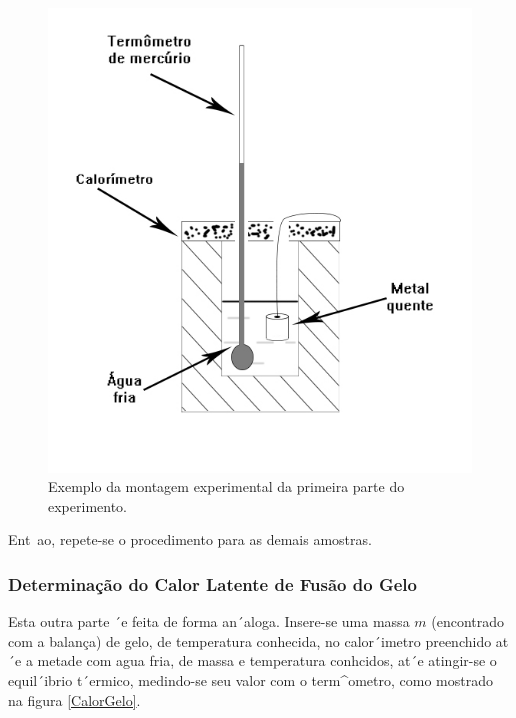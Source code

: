 \documentclass[12pt,a4paper]{article}
\begin{document}
\begin{figure}[!htbp]
\centering
\includegraphics[scale=0.55]{Fig6b1.jpg}
\caption{Exemplo da montagem experimental da primeira parte do experimento.}
\label{CalorMetais}
\end{figure}

Ent~ao, repete-se o procedimento para as demais amostras.

\subsubsection{Determinação do Calor Latente de Fusão do Gelo}

Esta outra parte ´e feita de forma an´aloga. Insere-se uma massa $m$ (encontrado com a balança) de gelo, de temperatura conhecida, no calor´imetro preenchido at´e a metade com agua fria, de massa e temperatura conhcidos, at´e atingir-se o equil´ibrio t´ermico, medindo-se seu valor com o term^ometro, como mostrado na figura \ref{CalorGelo}.
\end{document}
